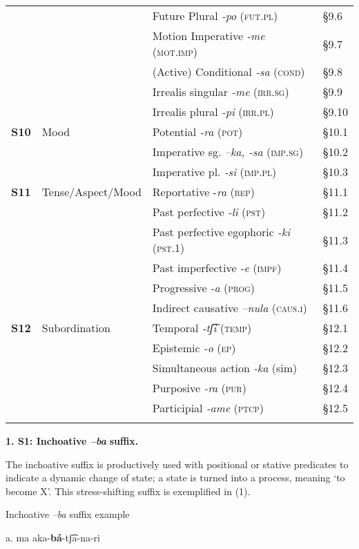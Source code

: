 \begin{tabularx}{\textwidth}{XXXX}
&  & Future Plural \textit{{}-po} (\textsc{fut.pl}) & §9.6\\
&  & Motion Imperative \textit{-me} (\textsc{mot.imp}) & §9.7\\
&  & (Active) Conditional \textit{-sa} (\textsc{cond}) & §9.8\\
&  & Irrealis singular \textit{{}-me} (\textsc{irr.sg}) & §9.9\\
&  & Irrealis plural \textit{{}-pi} (\textsc{irr.pl}) & §9.10\\
 \textbf{S10} & Mood & Potential \textit{-ra} (\textsc{pot}) & §10.1\\
&  & Imperative sg. \textit{–ka, -sa} (\textsc{imp.sg})  & §10.2\\
&  & Imperative pl. \textit{{}-si} (\textsc{imp.pl}) & §10.3\\
 \textbf{S11} & Tense/Aspect/Mood & Reportative -\textit{ra} (\textsc{rep}) & §11.1\\
&  & Past perfective \textit{{}-l}\textit{i} (\textsc{pst}) & §11.2\\
&  & Past perfective egophoric \textit{-ki} (\textsc{pst.1}) & §11.3\\
&  & Past imperfective \textit{-e} (\textsc{impf}) & §11.4\\
&  & Progressive \textit{-a} (\textsc{prog}) & §11.5\\
&  & Indirect causative \textit{–nula} (\textsc{caus.i)}  & §11.6\\
 \textbf{S12} & Subordination & Temporal \textit{{}-}\textit{tʃ͡i} (\textsc{temp}) & §12.1\\
&  & Epistemic \textit{{}-o} (\textsc{ep}) & §12.2\\
&  & Simultaneous action \textit{-ka} (sim) & §12.3\\
&  & Purposive \textit{-ra} (\textsc{pur}) & §12.4\\
&  & Participial \textit{-ame} (\textsc{ptcp}) & §12.5\\
\lspbottomrule
\end{tabularx}
\textbf{1. S1: Inchoative \textit{–ba} }\textbf{suffix.}


The inchoative suffix is productively used with positional or stative predicates to indicate a dynamic change of state; a state is turned into a process, meaning ‘to become X’. This stress-shifting suffix is exemplified in (1).


   Inchoative \textit{–ba} suffix example

a.   ma    aka-\textbf{bá}{}-tʃ͡a-na-ri 

